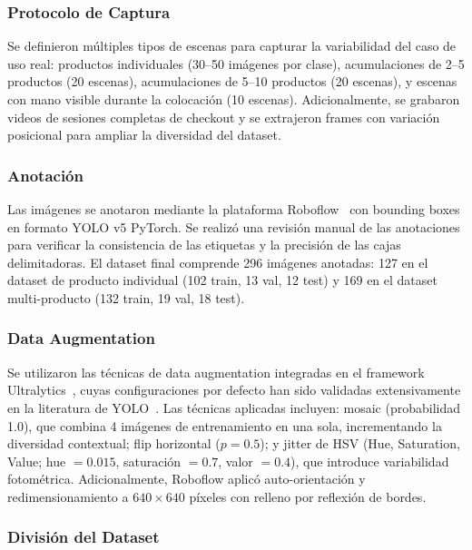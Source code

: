 \documentclass[conference,a4paper]{IEEEtran}[2015/08/26]
\begin{document}
\subsubsection{Protocolo de Captura}

Se definieron múltiples tipos de escenas para capturar la variabilidad del caso de uso real: productos individuales (30--50 imágenes por clase), acumulaciones de 2--5 productos (20 escenas), acumulaciones de 5--10 productos (20 escenas), y escenas con mano visible durante la colocación (10 escenas). Adicionalmente, se grabaron videos de sesiones completas de checkout y se extrajeron frames con variación posicional para ampliar la diversidad del dataset.

\subsubsection{Anotación}

Las imágenes se anotaron mediante la plataforma Roboflow~\cite{roboflow2023} con bounding boxes en formato YOLO v5 PyTorch. Se realizó una revisión manual de las anotaciones para verificar la consistencia de las etiquetas y la precisión de las cajas delimitadoras. El dataset final comprende 296 imágenes anotadas: 127 en el dataset de producto individual (102 train, 13 val, 12 test) y 169 en el dataset multi-producto (132 train, 19 val, 18 test).

\subsubsection{Data Augmentation}

Se utilizaron las técnicas de data augmentation integradas en el framework Ultralytics~\cite{jocher2023ultralytics}, cuyas configuraciones por defecto han sido validadas extensivamente en la literatura de YOLO~\cite{bochkovskiy2020yolov4, shorten2019augmentation}. Las técnicas aplicadas incluyen: mosaic (probabilidad 1.0), que combina 4 imágenes de entrenamiento en una sola, incrementando la diversidad contextual; flip horizontal ($p=0.5$); y jitter de HSV (Hue, Saturation, Value; hue $= 0.015$, saturación $= 0.7$, valor $= 0.4$), que introduce variabilidad fotométrica. Adicionalmente, Roboflow aplicó auto-orientación y redimensionamiento a $640 \times 640$ píxeles con relleno por reflexión de bordes.

\subsubsection{División del Dataset}
\end{document}
